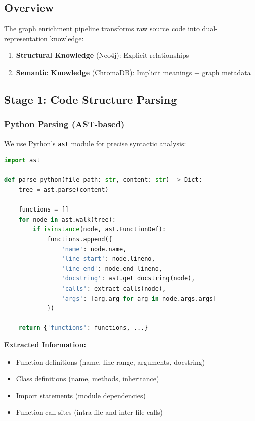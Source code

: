 \documentclass[11pt,letterpaper]{article}
\begin{document}
\subsection{Overview}

The graph enrichment pipeline transforms raw source code into dual-representation knowledge:

\begin{enumerate}
    \item \textbf{Structural Knowledge} (Neo4j): Explicit relationships
    \item \textbf{Semantic Knowledge} (ChromaDB): Implicit meanings + graph metadata
\end{enumerate}

\subsection{Stage 1: Code Structure Parsing}

\subsubsection{Python Parsing (AST-based)}

We use Python's \texttt{ast} module for precise syntactic analysis:

\begin{lstlisting}[language=Python, caption=Python AST parsing example]
import ast

def parse_python(file_path: str, content: str) -> Dict:
    tree = ast.parse(content)
    
    functions = []
    for node in ast.walk(tree):
        if isinstance(node, ast.FunctionDef):
            functions.append({
                'name': node.name,
                'line_start': node.lineno,
                'line_end': node.end_lineno,
                'docstring': ast.get_docstring(node),
                'calls': extract_calls(node),
                'args': [arg.arg for arg in node.args.args]
            })
    
    return {'functions': functions, ...}
\end{lstlisting}

\textbf{Extracted Information:}
\begin{itemize}
    \item Function definitions (name, line range, arguments, docstring)
    \item Class definitions (name, methods, inheritance)
    \item Import statements (module dependencies)
    \item Function call sites (intra-file and inter-file calls)
\end{itemize}
\end{document}
